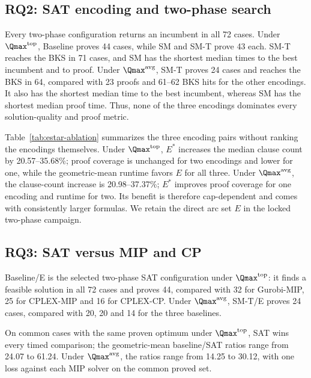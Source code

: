 \subsection{RQ2: SAT encoding and two-phase search}



Every two-phase configuration returns an incumbent in all 72 cases. Under
\(\Qmax^{\mathrm{top}}\), Baseline proves 44 cases, while SM and SM-T prove
43 each. SM-T reaches the BKS in 71 cases, and SM has the shortest median
times to the best incumbent and to proof. Under
\(\Qmax^{\mathrm{avg}}\), SM-T proves 24 cases and reaches the BKS in 64,
compared with 23 proofs and 61--62 BKS hits for the other encodings. It also
has the shortest median time to the best incumbent, whereas SM has the
shortest median proof time. Thus, none of the three encodings dominates every
solution-quality and proof metric.



Table~\ref{tab:estar-ablation} summarizes the three encoding pairs without
ranking the encodings themselves. Under \(\Qmax^{\mathrm{top}}\), \(E^*\)
increases the median clause count by 20.57--35.68\%; proof coverage is
unchanged for two encodings and lower for one, while the geometric-mean
runtime favors \(E\) for all three. Under \(\Qmax^{\mathrm{avg}}\), the
clause-count increase is 20.98--37.37\%; \(E^*\) improves proof coverage for
one encoding and runtime for two. Its benefit is therefore cap-dependent and
comes with consistently larger formulas. We retain the direct arc set \(E\)
in the locked two-phase campaign.

\subsection{RQ3: SAT versus MIP and CP}



Baseline/E is the selected two-phase SAT configuration under
\(\Qmax^{\mathrm{top}}\): it finds a feasible solution in all 72 cases and
proves 44, compared with 32 for Gurobi-MIP, 25 for CPLEX-MIP and 16 for
CPLEX-CP. Under \(\Qmax^{\mathrm{avg}}\), SM-T/E proves 24 cases, compared
with 20, 20 and 14 for the three baselines.



On common cases with the same proven optimum under
\(\Qmax^{\mathrm{top}}\), SAT wins every timed comparison; the geometric-mean
baseline/SAT ratios range from 24.07 to 61.24. Under
\(\Qmax^{\mathrm{avg}}\), the ratios range from 14.25 to 30.12, with one loss
against each MIP solver on the common proved set.

